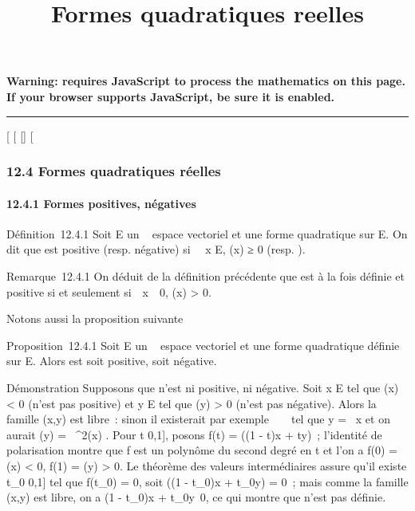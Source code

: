 \documentclass[]{article}
\title{Formes quadratiques reelles}
\author{}
\date{}
\begin{document}
\maketitle

\textbf{Warning: 
requires JavaScript to process the mathematics on this page.\\ If your
browser supports JavaScript, be sure it is enabled.}

\begin{center}\rule{3in}{0.4pt}\end{center}

{[}
{[}
{[}{]}
{[}

\subsubsection{12.4 Formes quadratiques réelles}

\paragraph{12.4.1 Formes positives, négatives}

Définition~12.4.1 Soit E un ~ espace vectoriel et \Phi une forme
quadratique sur E. On dit que \Phi est positive (resp. négative) si
\forall~~x \in E, \Phi(x) ≥ 0 (resp. ).

Remarque~12.4.1 On déduit de la définition précédente que \Phi est à la
fois définie et positive si et seulement
si~\forall~x\mathrel\neq~~0, \Phi(x)
\textgreater{} 0.

Notons aussi la proposition suivante

Proposition~12.4.1 Soit E un ~ espace vectoriel et \Phi une forme
quadratique définie sur E. Alors \Phi est soit positive, soit négative.

Démonstration Supposons que \Phi n'est ni positive, ni négative. Soit x \in E
tel que \Phi(x) \textless{} 0 (\Phi n'est pas positive) et y \in E tel que \Phi(y)
\textgreater{} 0 (\Phi n'est pas négative). Alors la famille (x,y) est
libre~: sinon il existerait par exemple \lambda~ \in {}~ tel que y = \lambda~x et on
aurait \Phi(y) = \lambda~^2\Phi(x) . Pour t \in {[}0,1{]}, posons f(t) =
\Phi((1 - t)x + ty)~; l'identité de polarisation montre que f est un
polynôme du second degré en t et l'on a f(0) = \Phi(x) \textless{} 0, f(1)
= \Phi(y) \textgreater{} 0. Le théorème des valeurs intermédiaires assure
qu'il existe t_0 \in {[}0,1{]} tel que f(t_0) = 0, soit
\Phi((1 - t_0)x + t_0y) = 0~; mais comme la famille (x,y)
est libre, on a (1 - t_0)x +
t_0y\neq~0, ce qui montre que \Phi n'est
pas définie.
\end{document}
